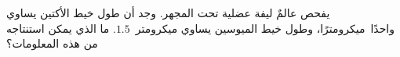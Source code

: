 
\begin{question}

\begin{instance}

\begin{mcq}[standalone=false]

\begin{stem}
يفحص عالمٌ ليفة عضلية تحت المجهر. وجد أن طول خيط الأكتين يساوي واحدًا\ ميكرومترًا، وطول خيط الميوسين يساوي ميكرومتر\ $1.5$. ما الذي يمكن استنتاجه من هذه المعلومات؟\par

\end{stem}

\begin{distractors}
        
\end{distractors}

\end{mcq}

\end{instance}

\end{question}
